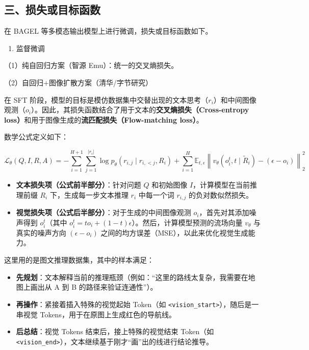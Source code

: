 \hypertarget{ux4e09ux635fux5931ux6216ux76eeux6807ux51fdux6570}{%
\subsection{三、损失或目标函数}\label{ux4e09ux635fux5931ux6216ux76eeux6807ux51fdux6570}}

在 BAGEL 等多模态输出模型上进行微调，损失或目标函数如下。

\begin{enumerate}
\def\labelenumi{\arabic{enumi}.}
\tightlist
\item
  监督微调
\end{enumerate}

（1）纯自回归方案（智源 Emu）：统一的交叉熵损失。

（2）自回归+图像扩散方案（清华/字节研究）

在 SFT 阶段，模型的目标是模仿数据集中交替出现的文本思考（\(r_i\)）和中间图像观测（\(o_i\)）。因此，其损失函数结合了用于文本的\textbf{交叉熵损失（Cross-entropy loss）}和用于图像生成的\textbf{流匹配损失（Flow-matching loss）}。

数学公式定义如下：

\[
\mathcal{L}_{\theta}(Q,I,R,A)
=-\sum_{i=1}^{H+1}\sum_{j=1}^{|r_i|}
\log p_{\theta}(r_{i,j}\mid r_{i,\lt j},R_i)
+\sum_{i=1}^{H}\mathbb{E}_{t,\epsilon}
\left\lVert
v_{\theta}(o_i^t,t\mid\tilde R_i)-(\epsilon-o_i)
\right\rVert_2^2
\]

\begin{itemize}
\tightlist
\item
  \textbf{文本损失项（公式前半部分）}：针对问题 \(Q\) 和初始图像 \(I\)，计算模型在当前推理前缀 \(R_i\) 下，生成每一步文本推理 \(r_i\) 中每一个词 \(r_{i,j}\) 的负对数似然损失。
\item
  \textbf{视觉损失项（公式后半部分）}：对于生成的中间图像观测 \(o_i\)，首先对其添加噪声得到 \(o_i^t\)（其中 \(o_i^t=to_i+(1-t)\epsilon\)）。然后，计算模型预测的流场向量 \(v_{\theta}\) 与真实的噪声方向 \((\epsilon-o_i)\) 之间的均方误差（MSE），以此来优化视觉生成能力。
\end{itemize}

这里用的是图文推理数据集，其中的样本满足：

\begin{itemize}
\tightlist
\item
  \textbf{先规划}：文本解释当前的推理瓶颈（例如：``这里的路线太复杂，我需要在地图上画出从 A 到 B 的路径来验证连通性''）。
\item
  \textbf{再操作}：紧接着插入特殊的视觉起始 Token（如 \texttt{\textless{}vision\_start\textgreater{}}），随后是一串视觉 Tokens，用于在原图上生成红色的导航线。
\item
  \textbf{后总结}：视觉 Tokens 结束后，接上特殊的视觉结束 Token（如 \texttt{\textless{}vision\_end\textgreater{}}），文本继续基于刚才``画''出的线进行结论推导。
\end{itemize}

